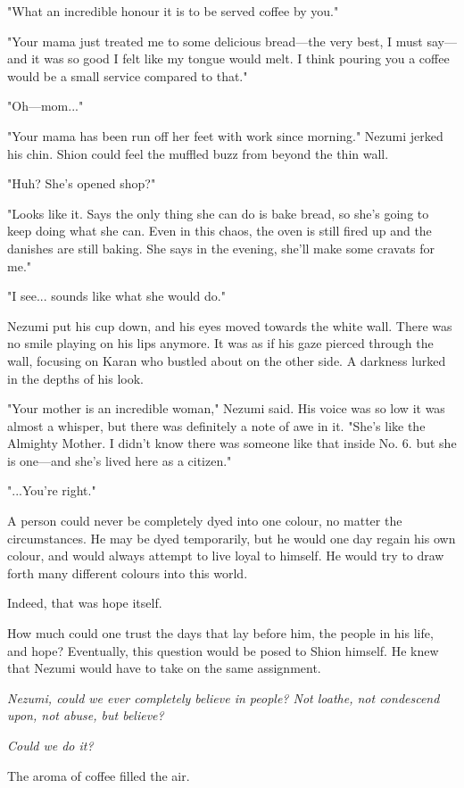 "What an incredible honour it is to be served coffee by you."

"Your mama just treated me to some delicious bread---the very best, I must
say---and it was so good I felt like my tongue would melt. I think pouring
you a coffee would be a small service compared to that."

"Oh---mom..."

"Your mama has been run off her feet with work since morning." Nezumi
jerked his chin. Shion could feel the muffled buzz from beyond the thin
wall.

"Huh? She's opened shop?"

"Looks like it. Says the only thing she can do is bake bread, so she's
going to keep doing what she can. Even in this chaos, the oven is still
fired up and the danishes are still baking. She says in the evening,
she'll make some cravats for me."

"I see... sounds like what she would do."

Nezumi put his cup down, and his eyes moved towards the white wall.
There was no smile playing on his lips anymore. It was as if his gaze
pierced through the wall, focusing on Karan who bustled about on the
other side. A darkness lurked in the depths of his look.

"Your mother is an incredible woman," Nezumi said. His voice was so low
it was almost a whisper, but there was definitely a note of awe in it.
"She's like the Almighty Mother. I didn't know there was someone like
that inside No. 6. but she is one---and she's lived here as a citizen."

"...You're right."

A person could never be completely dyed into one colour, no matter the
circumstances. He may be dyed temporarily, but he would one day regain
his own colour, and would always attempt to live loyal to himself. He
would try to draw forth many different colours into this world.

Indeed, that was hope itself.

How much could one trust the days that lay before him, the people in his
life, and hope? Eventually, this question would be posed to Shion
himself. He knew that Nezumi would have to take on the same assignment.

\emph{Nezumi, could we ever completely believe in people? Not loathe, not
condescend upon, not abuse, but believe?}

\emph{Could we do it?}

The aroma of coffee filled the air.

